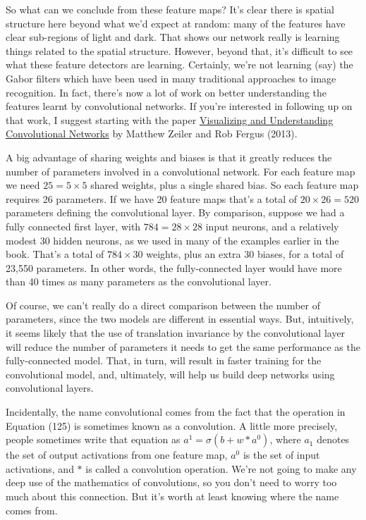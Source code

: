 \documentclass[a4paper,twoside,10pt]{book}
\begin{document}
So what can we conclude from these feature maps? It's clear there is spatial structure here beyond what we'd expect at random: many of the features have clear sub-regions of light and dark. That shows our network really is learning things related to the spatial structure. However, beyond that, it's difficult to see what these feature detectors are learning. Certainly, we're not learning (say) the Gabor filters which have been used in many traditional approaches to image recognition. In fact, there's now a lot of work on better understanding the features learnt by convolutional networks. If you're interested in following up on that work, I suggest starting with the paper \href{http://arxiv.org/abs/1311.2901}{Visualizing and Understanding Convolutional Networks} by Matthew Zeiler and Rob Fergus (2013).

A big advantage of sharing weights and biases is that it greatly reduces the number of parameters involved in a convolutional network. For each feature map we need $25=5\times5$ shared weights, plus a single shared bias. So each feature map requires 26 parameters. If we have 20 feature maps that's a total of $20\times26=520$ parameters defining the convolutional layer. By comparison, suppose we had a fully connected first layer, with $784=28\times28$ input neurons, and a relatively modest 30 hidden neurons, as we used in many of the examples earlier in the book. That's a total of $784\times30$ weights, plus an extra 30 biases, for a total of 23,550 parameters. In other words, the fully-connected layer would have more than 40 times as many parameters as the convolutional layer.

Of course, we can't really do a direct comparison between the number of parameters, since the two models are different in essential ways. But, intuitively, it seems likely that the use of translation invariance by the convolutional layer will reduce the number of parameters it needs to get the same performance as the fully-connected model. That, in turn, will result in faster training for the convolutional model, and, ultimately, will help us build deep networks using convolutional layers.

Incidentally, the name convolutional comes from the fact that the operation in Equation (125) is sometimes known as a convolution. A little more precisely, people sometimes write that equation as $a^1=\sigma(b+w\ast a^0)$, where $a_1$ denotes the set of output activations from one feature map, $a^0$ is the set of input activations, and $\ast$ is called a convolution operation. We're not going to make any deep use of the mathematics of convolutions, so you don't need to worry too much about this connection. But it's worth at least knowing where the name comes from.
\end{document}

